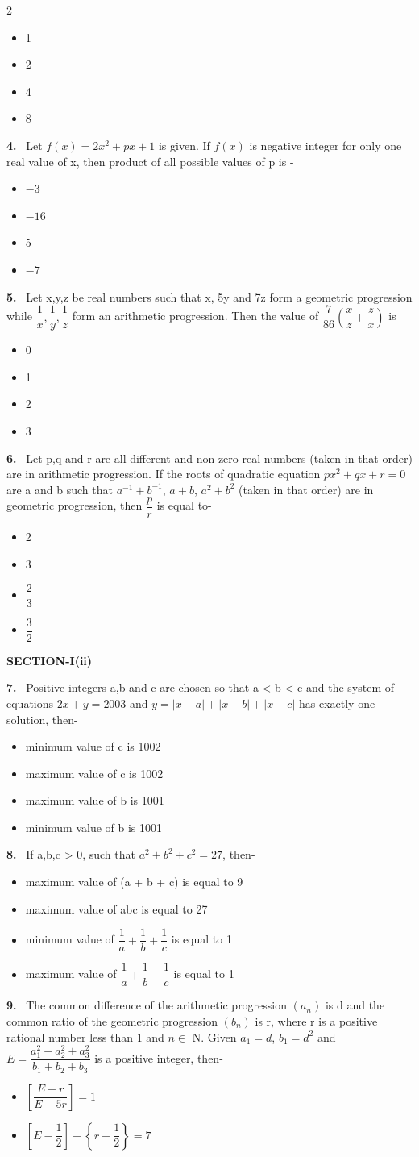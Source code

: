 \documentclass[10pt]{extarticle}
\newcommand{\sect}[1]{\par\smallskip\noindent\textbf{#1}\par}
\newcommand{\qn}[1]{\par\smallskip\noindent\textbf{#1.}~}
\newenvironment{qoptions}{\begin{itemize}[leftmargin=1.8em,itemsep=1pt,topsep=2pt,label={}]}{\end{itemize}}
\newcommand{\opt}[2]{\item[(#1)] #2}
\begin{document}
\begin{multicols}{2}
\begin{qoptions}
\opt{A}{1}
\opt{B}{2}
\opt{C}{4}
\opt{D}{8}
\end{qoptions}
\qn{4} Let $f(x)=2x^2+px+1$ is given. If $f(x)$ is negative integer for only one real value of x, then product of all possible values of p is -
\begin{qoptions}
\opt{A}{$-3$}
\opt{B}{$-16$}
\opt{C}{5}
\opt{D}{$-7$}
\end{qoptions}
\qn{5} Let x,y,z be real numbers such that x, 5y and 7z form a geometric progression while $\dfrac1x,\dfrac1y,\dfrac1z$ form an arithmetic progression. Then the value of $\dfrac7{86}\left(\dfrac xz+\dfrac zx\right)$ is
\begin{qoptions}
\opt{A}{0}
\opt{B}{1}
\opt{C}{2}
\opt{D}{3}
\end{qoptions}
\qn{6} Let p,q and r are all different and non-zero real numbers (taken in that order) are in arithmetic progression. If the roots of quadratic equation $px^2+qx+r=0$ are a and b such that $a^{-1}+b^{-1}$, $a+b$, $a^2+b^2$ (taken in that order) are in geometric progression, then $\dfrac pr$ is equal to-
\begin{qoptions}
\opt{A}{2}
\opt{B}{3}
\opt{C}{$\dfrac23$}
\opt{D}{$\dfrac32$}
\end{qoptions}
\sect{SECTION-I(ii)}
\qn{7} Positive integers a,b and c are chosen so that a < b < c and the system of equations $2x+y=2003$ and $y=|x-a|+|x-b|+|x-c|$ has exactly one solution, then-
\begin{qoptions}
\opt{A}{minimum value of c is 1002}
\opt{B}{maximum value of c is 1002}
\opt{C}{maximum value of b is 1001}
\opt{D}{minimum value of b is 1001}
\end{qoptions}
\qn{8} If a,b,c > 0, such that $a^2+b^2+c^2=27$, then-
\begin{qoptions}
\opt{A}{maximum value of (a + b + c) is equal to 9}
\opt{B}{maximum value of abc is equal to 27}
\opt{C}{minimum value of $\dfrac1a+\dfrac1b+\dfrac1c$ is equal to 1}
\opt{D}{maximum value of $\dfrac1a+\dfrac1b+\dfrac1c$ is equal to 1}
\end{qoptions}
\qn{9} The common difference of the arithmetic progression $(a_n)$ is d and the common ratio of the geometric progression $(b_n)$ is r, where r is a positive rational number less than 1 and $n\in$ N. Given $a_1=d$, $b_1=d^2$ and $E=\dfrac{a_1^2+a_2^2+a_3^2}{b_1+b_2+b_3}$ is a positive integer, then-
\begin{qoptions}
\opt{A}{$\left[\dfrac{E+r}{E-5r}\right]=1$}
\opt{B}{$\left[E-\dfrac12\right]+\left\{r+\dfrac12\right\}=7$}

\end{qoptions}
\end{multicols}
\end{document}
